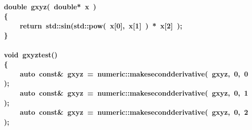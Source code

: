 \documentclass[9pt,onside]{article}
\newcommand{\hlstd}[1]{\textcolor[rgb]{0.2,0,0.4}{#1}}
\newcommand{\hlnum}[1]{\textcolor[rgb]{0.2,0.73,0.02}{#1}}
\newcommand{\hlopt}[1]{\textcolor[rgb]{0.33,0.33,0.33}{#1}}
\newcommand{\hlkwa}[1]{\textcolor[rgb]{1,0.19,0.19}{#1}}
\newcommand{\hlkwb}[1]{\textcolor[rgb]{0.96,0.55,0.14}{#1}}
\newcommand{\hlkwc}[1]{\textcolor[rgb]{0,0,1}{#1}}
\newcommand{\hlkwd}[1]{\textcolor[rgb]{0.82,0.11,0.93}{#1}}
\begin{document}
\paragraph{
\hlkwb{double\ }\hlstd{}\hlkwd{gxyz}\hlstd{}\hlopt{(\ }\hlstd{}\hlkwb{double}\hlstd{}\hlopt{{*}\ }\hlstd{x\ }\hlopt{)}\hspace*{\fill}\\
\hlstd{}\hlopt{\{}\hspace*{\fill}\\
\hlstd{}\hlstd{\ \ \ \ }\hlstd{}\hlkwa{return\ }\hlstd{std}\hlopt{::}\hlstd{}\hlkwd{sin}\hlstd{}\hlopt{(}\hlstd{std}\hlopt{::}\hlstd{}\hlkwd{pow}\hlstd{}\hlopt{(\ }\hlstd{x}\hlopt{{[}}\hlstd{}\hlnum{0}\hlstd{}\hlopt{{]},\ }\hlstd{x}\hlopt{{[}}\hlstd{}\hlnum{1}\hlstd{}\hlopt{{]}\ )\ {*}\ }\hlstd{x}\hlopt{{[}}\hlstd{}\hlnum{2}\hlstd{}\hlopt{{]}\ );}\hspace*{\fill}\\
\hlstd{}\hlopt{\}}\hspace*{\fill}\\
\hlstd{}\hspace*{\fill}\\
\hlkwb{void\ }\hlstd{}\hlkwd{gxyz\textunderscore test}\hlstd{}\hlopt{()}\hspace*{\fill}\\
\hlstd{}\hlopt{\{}\hspace*{\fill}\\
\hlstd{}\hlstd{\ \ \ \ }\hlstd{}\hlkwc{auto\ }\hlstd{}\hlkwb{const}\hlstd{}\hlopt{\&\ }\hlstd{gxyz\ }\hlopt{=\ }\hlstd{numeric}\hlopt{::}\hlstd{}\hlkwd{make\textunderscore second\textunderscore derivative}\hlstd{}\hlopt{(\ }\hlstd{gxyz}\hlopt{,\ }\hlstd{}\hlnum{0}\hlstd{}\hlopt{,\ }\hlstd{}\hlnum{0\ }\hlstd{}\hlopt{);}\hspace*{\fill}\\
\hlstd{}\hlstd{\ \ \ \ }\hlstd{}\hlkwc{auto\ }\hlstd{}\hlkwb{const}\hlstd{}\hlopt{\&\ }\hlstd{gxyz\ }\hlopt{=\ }\hlstd{numeric}\hlopt{::}\hlstd{}\hlkwd{make\textunderscore second\textunderscore derivative}\hlstd{}\hlopt{(\ }\hlstd{gxyz}\hlopt{,\ }\hlstd{}\hlnum{0}\hlstd{}\hlopt{,\ }\hlstd{}\hlnum{1\ }\hlstd{}\hlopt{);}\hspace*{\fill}\\
\hlstd{}\hlstd{\ \ \ \ }\hlstd{}\hlkwc{auto\ }\hlstd{}\hlkwb{const}\hlstd{}\hlopt{\&\ }\hlstd{gxyz\ }\hlopt{=\ }\hlstd{numeric}\hlopt{::}\hlstd{}\hlkwd{make\textunderscore second\textunderscore derivative}\hlstd{}\hlopt{(\ }\hlstd{gxyz}\hlopt{,\ }\hlstd{}\hlnum{0}\hlstd{}\hlopt{,\ }\hlstd{}\hlnum{2\ }\hlstd{}\hlopt{);}\hspace*{\fill}\\
}
\end{document}
